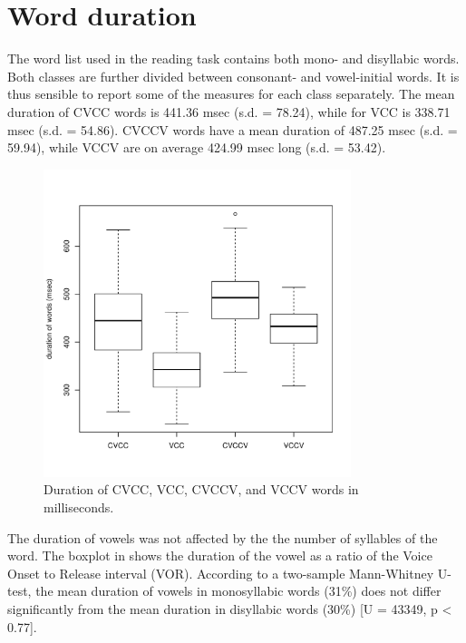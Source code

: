 \documentclass[11pt,a4paper,oneside,openany]{memoir}\usepackage[]{graphicx}\usepackage[]{color}
\newenvironment{knitrout}{}{} %
\begin{document}
\section{Word duration}
\label{s:wordduration}

The word list used in the reading task contains both mono- and disyllabic words.
Both classes are further divided between consonant- and vowel-initial words.
It is thus sensible to report some of the measures for each class separately.
The mean duration of CVCC words is 441.36 msec (s.d. = 78.24), while for VCC is 338.71 msec (s.d. = 54.86).
CVCCV words have a mean duration of 487.25 msec (s.d. = 59.94), while VCCV are on average 424.99 msec long (s.d. = 53.42).

\begin{figure}
\centering
\begin{knitrout}
\color{fgcolor}
\includegraphics[width=0.8\textwidth]{img/word-duration-1} 

\end{knitrout}
\caption{Duration of CVCC, VCC, CVCCV, and VCCV words in milliseconds.}
\label{f:worddur}
\end{figure}



The duration of vowels was not affected by the the number of syllables of the word.
The boxplot in  shows the duration of the vowel as a ratio of the Voice Onset to Release interval (VOR).
According to a two-sample Mann-Whitney U-test, the mean duration of vowels in monosyllabic words (31\%) does not differ significantly from the mean duration in disyllabic words (30\%) [U = 43349, p < 0.77].
\end{document}
